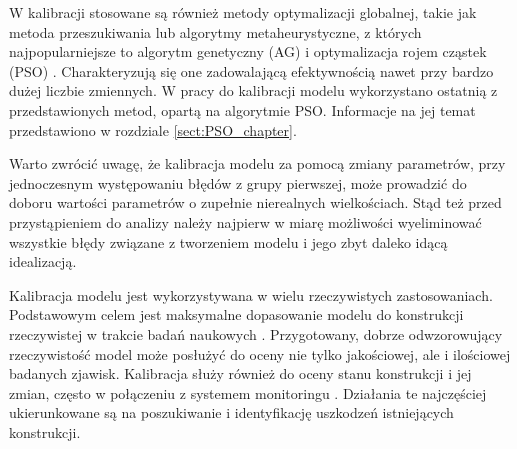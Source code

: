 W kalibracji stosowane są również metody optymalizacji globalnej, takie jak metoda przeszukiwania lub algorytmy metaheurystyczne, z których najpopularniejsze to algorytm genetyczny (AG) i optymalizacja rojem cząstek (PSO) \parencite{Boulkaibet2015,Tran-Ngoc2018,Dan2015,Qin2018}. Charakteryzują się one zadowalającą efektywnością nawet przy bardzo dużej liczbie zmiennych. W pracy do kalibracji modelu wykorzystano ostatnią z przedstawionych metod, opartą na algorytmie PSO. Informacje na jej temat przedstawiono w rozdziale \ref{sect:PSO_chapter}.

Warto zwrócić uwagę, że kalibracja modelu za pomocą zmiany parametrów, przy jednoczesnym występowaniu błędów z grupy pierwszej, może prowadzić do doboru wartości parametrów o zupełnie nierealnych wielkościach. Stąd też przed przystąpieniem do analizy należy najpierw w miarę możliwości wyeliminować wszystkie błędy związane z tworzeniem modelu i jego zbyt daleko idącą idealizacją.

Kalibracja modelu jest wykorzystywana w wielu rzeczywistych zastosowaniach. Podstawowym celem jest maksymalne dopasowanie modelu do konstrukcji rzeczywistej w trakcie badań naukowych \parencite{Li2020,Brownjohn2001,Zhang2019,Petersen2017}. Przygotowany, dobrze odwzorowujący rzeczywistość model może posłużyć do oceny nie tylko jakościowej, ale i ilościowej badanych zjawisk. Kalibracja służy również do oceny stanu konstrukcji i jej zmian, często w połączeniu z systemem monitoringu \parencite{Brownjohn2000,Brownjohn2003,Zoltowski2020}. Działania te najczęściej ukierunkowane są na poszukiwanie i identyfikację uszkodzeń istniejących konstrukcji.




